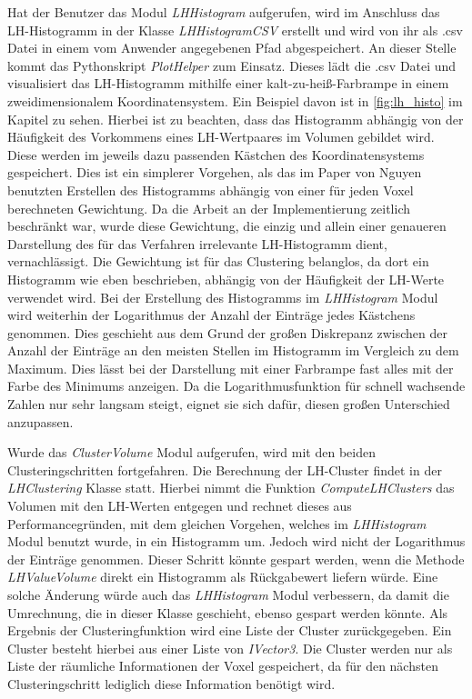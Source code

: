 Hat der Benutzer das Modul \textit{LHHistogram} aufgerufen, wird im Anschluss das LH-Histogramm in der Klasse \textit{LHHistogramCSV} erstellt und wird von ihr als .csv Datei in einem vom Anwender angegebenen Pfad abgespeichert.
An dieser Stelle kommt das Pythonskript \textit{PlotHelper} zum Einsatz. Dieses lädt die .csv Datei und visualisiert das LH-Histogramm mithilfe einer kalt-zu-heiß-Farbrampe in einem zweidimensionalem Koordinatensystem.
Ein Beispiel davon ist in \autoref{fig:lh_histo} im Kapitel  zu sehen. Hierbei ist zu beachten, dass das Histogramm abhängig von der Häufigkeit des Vorkommens eines LH-Wertpaares im Volumen gebildet wird. Diese werden im jeweils dazu passenden Kästchen des Koordinatensystems gespeichert. Dies ist ein simplerer Vorgehen, als das im Paper von Nguyen \cite{nguyen2012clustering} benutzten Erstellen des Histogramms abhängig von einer für jeden Voxel berechneten Gewichtung.
\newline
Da die Arbeit an der Implementierung zeitlich beschränkt war, wurde diese Gewichtung, die einzig und allein einer genaueren Darstellung des für das Verfahren irrelevante LH-Histogramm dient, vernachlässigt. Die Gewichtung ist für das Clustering belanglos, da dort ein Histogramm wie eben beschrieben, abhängig von der Häufigkeit der LH-Werte verwendet wird.
Bei der Erstellung des Histogramms im \textit{LHHistogram} Modul wird weiterhin der Logarithmus der Anzahl der Einträge jedes Kästchens genommen. Dies geschieht aus dem Grund der großen Diskrepanz zwischen der Anzahl der Einträge an den meisten Stellen im Histogramm im Vergleich zu dem Maximum. Dies lässt bei der Darstellung mit einer Farbrampe fast alles mit der Farbe des Minimums anzeigen. Da die Logarithmusfunktion für schnell wachsende Zahlen nur sehr langsam steigt, eignet sie sich dafür, diesen großen Unterschied anzupassen.


Wurde das \textit{ClusterVolume} Modul aufgerufen, wird mit den beiden Clusteringschritten fortgefahren. Die Berechnung der LH-Cluster findet in der \textit{LHClustering} Klasse statt. Hierbei nimmt die Funktion \textit{ComputeLHClusters} das Volumen mit den LH-Werten entgegen und rechnet dieses aus Performancegründen, mit dem gleichen Vorgehen, welches im \textit{LHHistogram} Modul benutzt wurde, in ein Histogramm um. Jedoch wird nicht der Logarithmus der Einträge genommen. Dieser Schritt könnte gespart werden, wenn die Methode \textit{LHValueVolume} direkt ein Histogramm als Rückgabewert liefern würde. Eine solche Änderung würde auch das \textit{LHHistogram} Modul verbessern, da damit die Umrechnung, die in dieser Klasse geschieht, ebenso gespart werden könnte.
\newline
Als Ergebnis der Clusteringfunktion wird eine Liste der Cluster zurückgegeben. Ein Cluster besteht hierbei aus einer Liste von \textit{IVector3}. Die Cluster werden nur als Liste der räumliche Informationen der Voxel gespeichert, da für den nächsten Clusteringschritt  lediglich diese Information benötigt wird. 


